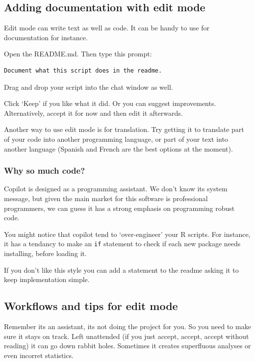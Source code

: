 \documentclass[
  letterpaper,
  DIV=11,
  numbers=noendperiod]{scrreprt}
\begin{document}
\subsection{Adding documentation with edit
mode}\label{adding-documentation-with-edit-mode}

Edit mode can write text as well as code. It can be handy to use for
documentation for instance.

Open the README.md. Then type this prompt:

\begin{verbatim}
Document what this script does in the readme. 
\end{verbatim}

Drag and drop your script into the chat window as well.

Click `Keep' if you like what it did. Or you can suggest improvements.
Alternatively, accept it for now and then edit it afterwards.

Another way to use edit mode is for translation. Try getting it to
translate part of your code into another programming language, or part
of your text into another language (Spanish and French are the best
options at the moment).

\subsubsection{Why so much code?}\label{why-so-much-code}

Copilot is designed as a programming assistant. We don't know its system
message, but given the main market for this software is professional
programmers, we can guess it has a strong emphasis on programming robust
code.

You might notice that copilot tend to `over-engineer' your R scripts.
For instance, it has a tendancy to make an \texttt{if} statement to
check if each new package needs installing, before loading it.

If you don't like this style you can add a statement to the readme
asking it to keep implementation simple.

\subsection{Workflows and tips for edit
mode}\label{workflows-and-tips-for-edit-mode}

Remember its an assistant, its not doing the project for you. So you
need to make sure it stays on track. Left unattended (if you just
accept, accept, accept without reading) it can go down rabbit holes.
Sometimes it creates superfluous analyses or even incorret statistics.
\end{document}
